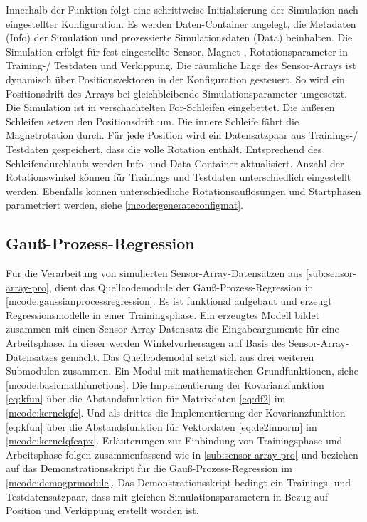 \clearpage


Innerhalb der Funktion folgt eine schrittweise Initialisierung der Simulation nach eingestellter Konfiguration. Es werden Daten-Container angelegt, die Metadaten (Info) der Simulation und prozessierte Simulationsdaten (Data) beinhalten. Die Simulation erfolgt für fest eingestellte Sensor, Magnet-, Rotationsparameter in Training-/ Testdaten und Verkippung. Die räumliche Lage des Sensor-Arrays ist dynamisch über Positionsvektoren in der Konfiguration gesteuert. So wird ein Positionsdrift des Arrays bei gleichbleibende Simulationsparameter umgesetzt. Die Simulation ist in verschachtelten For-Schleifen eingebettet. Die äußeren Schleifen setzen den Positionsdrift um. Die innere Schleife fährt die Magnetrotation durch. Für jede Position wird ein Datensatzpaar aus Trainings-/ Testdaten gespeichert, dass die volle Rotation enthält. Entsprechend des Schleifendurchlaufs werden Info- und Data-Container aktualisiert. Anzahl der Rotationswinkel können für Trainings und Testdaten unterschiedlich eingestellt werden. Ebenfalls können unterschiedliche Rotationsauflösungen und Startphasen parametriert werden, siehe \autoref{mcode:generateconfigmat}.


\subsection{Gauß-Prozess-Regression}\label{sub:gpr-pro}


Für die Verarbeitung von simulierten Sensor-Array-Datensätzen aus \autoref{sub:sensor-array-pro}, dient das Quellcodemodule der Gauß-Prozess-Regression in \autoref{mcode:gaussianprocessregression}. Es ist funktional aufgebaut und erzeugt Regressionsmodelle in einer Trainingsphase. Ein erzeugtes Modell bildet zusammen mit einen Sensor-Array-Datensatz die Eingabeargumente für eine Arbeitsphase. In dieser werden Winkelvorhersagen auf Basis des Sensor-Array-Datensatzes gemacht. Das Quellcodemodul setzt sich aus drei weiteren Submodulen zusammen. Ein Modul mit mathematischen Grundfunktionen, siehe \autoref{mcode:basicmathfunctions}. Die Implementierung der Kovarianzfunktion \autoref{eq:kfun} über die Abstandsfunktion für Matrixdaten \autoref{eq:df2} im \autoref{mcode:kernelqfc}. Und als drittes die Implementierung der Kovarianzfunktion \autoref{eq:kfun} über die Abstandsfunktion für Vektordaten \autoref{eq:de2innorm} im \autoref{mcode:kernelqfcapx}. Erläuterungen zur Einbindung von Trainingsphase und Arbeitsphase folgen zusammenfassend wie in \autoref{sub:sensor-array-pro} und beziehen auf das Demonstrationsskript für die Gauß-Prozess-Regression im \autoref{mcode:demogprmodule}. Das Demonstrationsskript bedingt ein Trainings- und Testdatensatzpaar, dass mit gleichen Simulationsparametern in Bezug auf Position und Verkippung erstellt worden ist.


